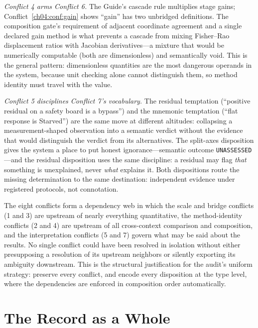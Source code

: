 \emph{Conflict 4 arms Conflict 6.} The Guide's cascade rule multiplies stage
gains; Conflict~\ref{ch04:conf:gain} shows ``gain'' has two unbridged
definitions. The composition gate's requirement of adjacent coordinate
agreement and a single declared gain method is what prevents a cascade from
mixing Fisher--Rao displacement ratios with Jacobian derivatives---a mixture
that would be numerically computable (both are dimensionless) and
semantically void. This is the general pattern: dimensionless quantities are
the most dangerous operands in the system, because unit checking alone
cannot distinguish them, so method identity must travel with the value.

\emph{Conflict 5 disciplines Conflict 7's vocabulary.} The residual
temptation (``positive residual on a safety board is a bypass'') and the
mnemonic temptation (``flat response is Starved'') are the same move at
different altitudes: collapsing a measurement-shaped observation into a
semantic verdict without the evidence that would distinguish the verdict
from its alternatives. The split-axes disposition gives the system a place
to put honest ignorance---semantic outcome \texttt{UNASSESSED}---and the
residual disposition uses the same discipline: a residual may flag
\emph{that} something is unexplained, never \emph{what} explains it. Both
dispositions route the missing determination to the same destination:
independent evidence under registered protocols, not connotation.

\begin{finding}\label{ch04:find:web}
The eight conflicts form a dependency web in which the scale and bridge
conflicts (1 and 3) are upstream of nearly everything quantitative, the
method-identity conflicts (2 and 4) are upstream of all cross-context
comparison and composition, and the interpretation conflicts (5 and 7)
govern what may be said about the results. No single conflict could have
been resolved in isolation without either presupposing a resolution of its
upstream neighbors or silently exporting its ambiguity downstream. This is
the structural justification for the audit's uniform strategy: preserve
every conflict, and encode every disposition at the type level, where the
dependencies are enforced in composition order automatically.
\end{finding}

\section{The Record as a Whole}\label{ch04:close}

